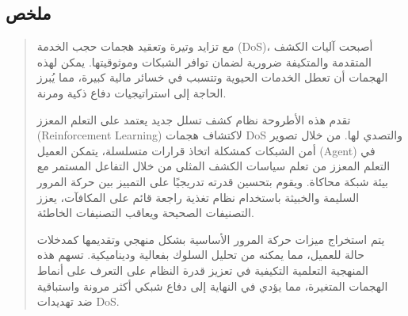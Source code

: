 \documentclass{report}
\begin{document}
\newpage
\begin{otherlanguage}{arabic}
\chapter*{ملخص}

\begin{quote}
\large
مع تزايد وتيرة وتعقيد هجمات حجب الخدمة (DoS)، أصبحت آليات الكشف المتقدمة والمتكيفة ضرورية لضمان توافر الشبكات وموثوقيتها. يمكن لهذه الهجمات أن تعطل الخدمات الحيوية وتتسبب في خسائر مالية كبيرة، مما يُبرز الحاجة إلى استراتيجيات دفاع ذكية ومرنة.

تقدم هذه الأطروحة نظام كشف تسلل جديد يعتمد على التعلم المعزز (Reinforcement Learning) لاكتشاف هجمات DoS والتصدي لها. من خلال تصوير أمن الشبكات كمشكلة اتخاذ قرارات متسلسلة، يتمكن العميل (Agent) في التعلم المعزز من تعلم سياسات الكشف المثلى من خلال التفاعل المستمر مع بيئة شبكة محاكاة. ويقوم بتحسين قدرته تدريجيًا على التمييز بين حركة المرور السليمة والخبيثة باستخدام نظام تغذية راجعة قائم على المكافآت، يعزز التصنيفات الصحيحة ويعاقب التصنيفات الخاطئة.

يتم استخراج ميزات حركة المرور الأساسية بشكل منهجي وتقديمها كمدخلات حالة للعميل، مما يمكنه من تحليل السلوك بفعالية وديناميكية. تسهم هذه المنهجية التعلمية التكيفية في تعزيز قدرة النظام على التعرف على أنماط الهجمات المتغيرة، مما يؤدي في النهاية إلى دفاع شبكي أكثر مرونة واستباقية ضد تهديدات DoS.
\end{quote}

\vspace{1em}
\end{otherlanguage}
\end{document}

